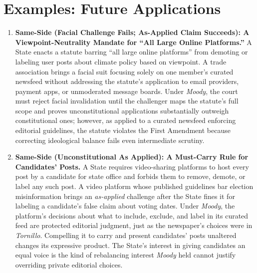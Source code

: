 \documentclass[12pt]{article}
\begin{document}
\section{Examples: Future Applications}
\begin{enumerate}

\item \textbf{Same-Side (Facial Challenge Fails; As-Applied Claim Succeeds): A Viewpoint-Neutrality Mandate for ``All Large Online Platforms.''} A State enacts a statute barring ``all large online platforms'' from demoting or labeling user posts about climate policy based on viewpoint. A trade association brings a facial suit focusing solely on one member's curated newsfeed without addressing the statute's application to email providers, payment apps, or unmoderated message boards. Under \textit{Moody}, the court must reject facial invalidation until the challenger maps the statute's full scope and proves unconstitutional applications substantially outweigh constitutional ones; however, as applied to a curated newsfeed enforcing editorial guidelines, the statute violates the First Amendment because correcting ideological balance fails even intermediate scrutiny.

\item \textbf{Same-Side (Unconstitutional As Applied): A Must-Carry Rule for Candidates' Posts.} A State requires video-sharing platforms to host every post by a candidate for state office and forbids them to remove, demote, or label any such post. A video platform whose published guidelines bar election misinformation brings an \emph{as-applied} challenge after the State fines it for labeling a candidate's false claim about voting dates. Under \textit{Moody}, the platform's decisions about what to include, exclude, and label in its curated feed are protected editorial judgment, just as the newspaper's choices were in \textit{Tornillo}. Compelling it to carry and present candidates' posts unaltered changes its expressive product. The State's interest in giving candidates an equal voice is the kind of rebalancing interest \textit{Moody} held cannot justify overriding private editorial choices.


\end{enumerate}
\end{document}
